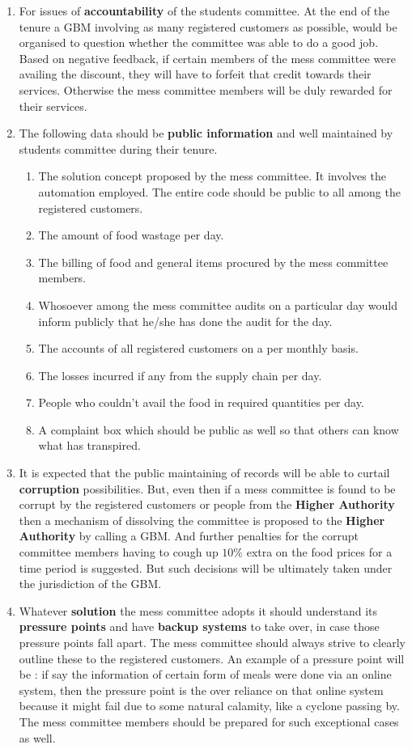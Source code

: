 \documentclass[12pt]{report}
\begin{document}
\begin{enumerate}
\item For issues of \textbf{accountability} of the students committee. At the end of the tenure a GBM involving as many registered customers as possible, would be organised to question whether the committee was able to do a good job. Based on negative feedback, if certain members of the mess committee were availing the discount, they will have to forfeit that credit towards their services. Otherwise the mess committee members will be duly rewarded for their services.
\item The following data should be \textbf{public information} and well maintained by students committee during their tenure. 
\begin{enumerate}
\item The solution concept proposed by the mess committee. It involves the automation employed. The entire code should be public to all among the registered customers.
\item The amount of food wastage per day.
\item The billing of food and general items procured by the mess committee members. 
\item Whosoever among the mess committee audits on a particular day would inform publicly that he/she has done the audit for the day.
\item The accounts of all registered customers on a per monthly basis.
\item The losses incurred if any from the supply chain per day.
\item People who couldn't avail the food in required quantities per day.
\item A complaint box which should be public as well so that others can know what has transpired.
\end{enumerate}

\item It is expected that the public maintaining of records will be able to curtail \textbf{corruption} possibilities. But, even then if a mess committee is found to be corrupt by the registered customers or people from the \textbf{Higher Authority} then a mechanism of dissolving the committee is proposed to the \textbf{Higher Authority} by calling a GBM. And further penalties for the corrupt committee members having to cough up $10\%$ extra on the food prices for a time period is suggested. But such decisions will be ultimately taken under the jurisdiction of the GBM.
\item Whatever \textbf{solution} the mess committee adopts it should understand its \textbf{pressure points} and have \textbf{backup systems} to take over, in case those pressure points fall apart. The mess committee  should always strive to  clearly outline these to the registered customers. An example of a pressure point will be : if say the information of certain form of meals were done via an online system, then the pressure point is the over reliance on that online system because it might fail due to some natural calamity, like a cyclone passing by. The mess committee members should be prepared for such exceptional cases as well.


\end{enumerate}
\end{document}
